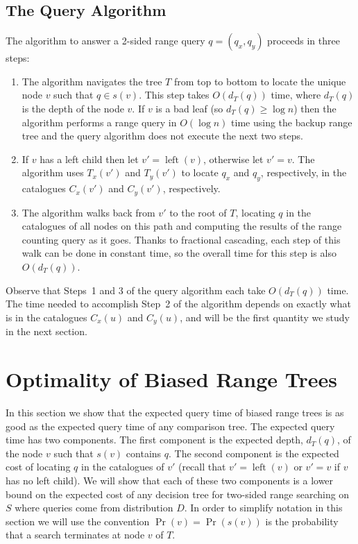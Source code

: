 \documentclass[charterfonts]{patmorin}
\DeclareMathOperator{\lft}{left}
\begin{document}
\subsection{The Query Algorithm}

The algorithm to answer a 2-sided range query $q=(q_x,q_y)$ proceeds
in three steps:

\begin{enumerate}

\item The algorithm navigates the tree $T$ from top to bottom to
locate the unique node $v$ such that $q\in s(v)$. This step takes
$O(d_T(q))$ time, where $d_T(q)$ is the depth of the node $v$.  If $v$
is a bad leaf (so $d_T(q)\ge \log n$) then the algorithm performs a
range query in $O(\log n)$ time using the backup range tree and the
query algorithm does not execute the next two steps.

\item  If $v$ has a left child then let $v'=\lft(v)$, otherwise let
$v'=v$. The algorithm uses $T_x(v')$ and $T_y(v')$ to locate $q_x$ and
$q_y$, respectively, in the catalogues $C_x(v')$ and $C_y(v')$,
respectively.

\item The algorithm walks back from $v'$ to the root of $T$, locating
$q$ in the catalogues of all nodes on this path and computing the
results of the range counting query as it goes.  Thanks to fractional
cascading, each step of this walk can be done in constant time, so the
overall time for this step is also $O(d_T(q))$.
\end{enumerate}

Observe that Steps~1 and 3 of the query algorithm each take
$O(d_T(q))$ time.  The time needed to accomplish Step~2 of the
algorithm depends on exactly what is in the catalogues $C_x(u)$ and
$C_y(u)$, and will be the first quantity we study in the next section.

\section{Optimality of Biased Range Trees}

In this section we show that the expected query time of biased range
trees is as good as the expected query time of any comparison tree.
The expected query time has two components.  The first component is
the expected depth, $d_T(q)$,  of the node $v$ such that $s(v)$
contains $q$.  The second component is the expected cost of locating
$q$ in the catalogues of $v'$ (recall that $v'=\lft(v)$ or $v'=v$ if $v$
has no left child).  We will show that each of these two components
is a lower bound on the expected cost of any decision tree for
two-sided range searching on $S$ where queries come from distribution
$D$.  In order to simplify notation in this section we will use the
convention $\Pr(v)=\Pr(s(v))$ is the probability that a search
terminates at node $v$ of $T$.  
\end{document}

